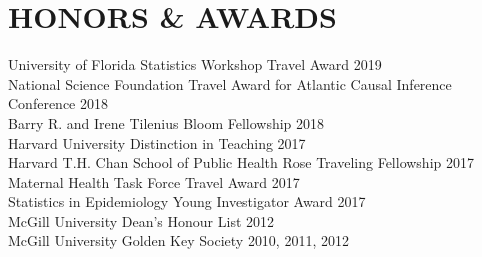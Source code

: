 \documentclass[12pt]{article}
\begin{document}




\section*{\textbf{{\large H}{ONORS} {\large \&} {\large A}{WARDS}}}
University of Florida Statistics Workshop Travel Award \hfill \hfill 2019 \\
National Science Foundation Travel Award for Atlantic Causal Inference Conference \hfill \hfill	2018 \\
Barry R. and Irene Tilenius Bloom Fellowship \hfill \hfill	2018 \\
Harvard University Distinction in Teaching \hfill \hfill 2017 \\
Harvard T.H. Chan School of Public Health Rose Traveling Fellowship \hfill \hfill	2017 \\
Maternal Health Task Force Travel Award \hfill \hfill	2017 \\
Statistics in Epidemiology Young Investigator Award  \hfill \hfill	2017 \\
McGill University Dean's Honour List  \hfill \hfill	2012 \\
McGill University Golden Key Society  \hfill \hfill2010, 2011, 2012 

\end{document}
